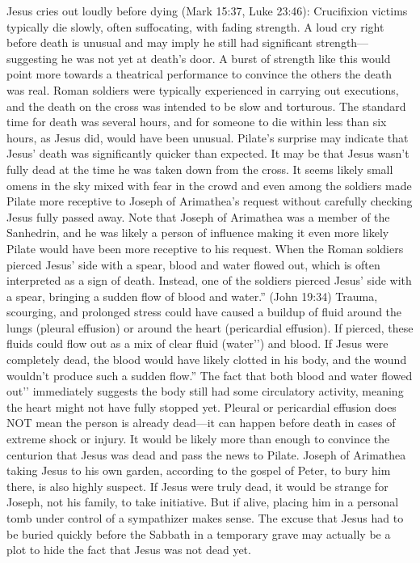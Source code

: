 Jesus cries out loudly before dying (Mark 15:37, Luke 23:46): Crucifixion victims typically die slowly, often suffocating, with fading strength.
A loud cry right before death is unusual and may imply he still had significant strength—suggesting he was not yet at death’s door.
A burst of strength like this would point more towards a theatrical performance to convince the others the death was real.
Roman soldiers were typically experienced in carrying out executions, and the death on the cross was intended to be slow and torturous.
The standard time for death was several hours, and for someone to die within less than six hours, as Jesus did, would have been unusual.
Pilate’s surprise may indicate that Jesus’ death was significantly quicker than expected.
It may be that Jesus wasn’t fully dead at the time he was taken down from the cross.
It seems likely small omens in the sky mixed with fear in the crowd and even among the soldiers made Pilate more receptive to Joseph of Arimathea’s request without carefully checking Jesus fully passed away.
Note that Joseph of Arimathea was a member of the Sanhedrin, and he was likely a person of influence making it even more likely Pilate would have been more receptive to his request.
When the Roman soldiers pierced Jesus’ side with a spear, blood and water flowed out, which is often interpreted as a sign of death.
Instead, one of the soldiers pierced Jesus' side with a spear, bringing a sudden flow of blood and water.'' (John 19:34) Trauma, scourging, and prolonged stress could have caused a buildup of fluid around the lungs (pleural effusion) or around the heart (pericardial effusion). If pierced, these fluids could flow out as a mix of clear fluid (water’’) and blood.
If Jesus were completely dead, the blood would have likely clotted in his body, and the wound wouldn’t produce such a sudden flow.'' The fact that both blood and water flowed out’’ immediately suggests the body still had some circulatory activity, meaning the heart might not have fully stopped yet.
Pleural or pericardial effusion does NOT mean the person is already dead—it can happen before death in cases of extreme shock or injury.
It would be likely more than enough to convince the centurion that Jesus was dead and pass the news to Pilate.
Joseph of Arimathea taking Jesus to his own garden, according to the gospel of Peter, to bury him there, is also highly suspect.
If Jesus were truly dead, it would be strange for Joseph, not his family, to take initiative.
But if alive, placing him in a personal tomb under control of a sympathizer makes sense.
The excuse that Jesus had to be buried quickly before the Sabbath in a temporary grave may actually be a plot to hide the fact that Jesus was not dead yet.
